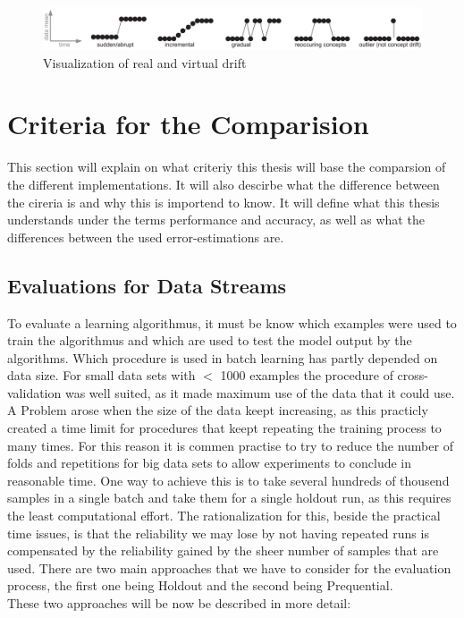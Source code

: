 \documentclass[12pt,oneside,a4paper,parskip]{scrbook}
\begin{document}
\begin{figure}[H]
  \centering
  \includegraphics[width=\columnwidth]{Concept_2}
  \caption{Visualization of real and virtual drift \cite{ConceptDrift}} 
  \label{fig:concept_2}
\end{figure}

\cite{ConceptDrift}

\section{Criteria for the Comparision}

This section will explain on what criteriy this thesis will base the comparsion of the different implementations. 
It will also descirbe what the difference between the cireria is and why this is importend to know.
It will define what this thesis understands under the terms performance and accuracy, as well as what the differences
between the used error-estimations are.

\subsection{Evaluations for Data Streams}
To evaluate a learning algorithmus, it must be know which examples were used to train the algorithmus and which are used to 
test the model output by the algorithms. Which procedure is used in batch learning has partly depended on data size.
For small data sets with $<$ 1000 examples the procedure of cross-validation was well suited, as it made maximum use of the
data that it could use.
A Problem arose when the size of the data keept increasing, as this practicly created a time limit for procedures that keept
repeating the training process to many times.
For this reason it is commen practise to try to reduce the number of folds and repetitions for big data sets to allow experiments
to conclude in reasonable time. 
One way to achieve this is to take several hundreds of thousend samples in a single batch and take them for a single holdout run,
as this requires the least computational effort. The rationalization for this, beside the practical time issues, is that the 
reliability we may lose by not having repeated runs is compensated by the reliability gained by the sheer number of samples that are used. 
There are two main approaches that we have to consider for the evaluation process, the first one being Holdout and the second being 
Prequential. \cite{Bifet_datastream} \\
These two approaches will be now be described in more detail:
\end{document}
